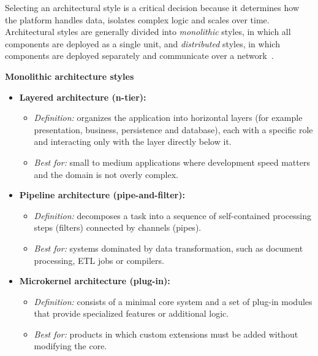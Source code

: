 Selecting an architectural style is a critical decision because it determines how the platform handles data, isolates complex logic and scales over time. Architectural styles are generally divided into \emph{monolithic} styles, in which all components are deployed as a single unit, and \emph{distributed} styles, in which components are deployed separately and communicate over a network~\cite{richards-ford}.

\textbf{Monolithic architecture styles}
\begin{itemize}
    \item \textbf{Layered architecture (n-tier):}
    \begin{itemize}
        \item \textit{Definition:} organizes the application into horizontal layers (for example presentation, business, persistence and database), each with a specific role and interacting only with the layer directly below it.
        \item \textit{Best for:} small to medium applications where development speed matters and the domain is not overly complex.
    \end{itemize}
    \item \textbf{Pipeline architecture (pipe-and-filter):}
    \begin{itemize}
        \item \textit{Definition:} decomposes a task into a sequence of self-contained processing steps (filters) connected by channels (pipes).
        \item \textit{Best for:} systems dominated by data transformation, such as document processing, ETL jobs or compilers.
    \end{itemize}
    \item \textbf{Microkernel architecture (plug-in):}
    \begin{itemize}
        \item \textit{Definition:} consists of a minimal core system and a set of plug-in modules that provide specialized features or additional logic.
        \item \textit{Best for:} products in which custom extensions must be added without modifying the core.
    \end{itemize}
\end{itemize}


